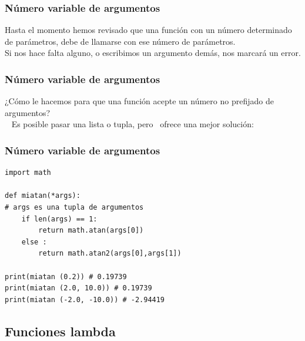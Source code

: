 \documentclass[12pt]{beamer}
\begin{document}
\begin{frame}[fragile]
\frametitle{Número variable de argumentos}
Hasta el momento hemos revisado que una función con un número determinado de parámetros, debe de llamarse con ese número de parámetros.
\\
\bigskip
\pause
Si nos hace falta alguno, o escribimos un argumento demás, nos marcará un error.
\end{frame}
\begin{frame}[fragile]
\frametitle{Número variable de argumentos}    
¿Cómo le hacemos para que una función acepte un número no prefijado de argumentos?
\\
\
\pause
Es posible pasar una lista o tupla, pero \python\ ofrece una mejor solución:
\end{frame}
\begin{frame}[fragile]
\frametitle{Número variable de argumentos}
\begin{lstlisting}[caption=Uso de *args, basicstyle=\linespread{1.2}\ttfamily\footnotesize, columns=fullflexible,escapeinside=||]
import math

def miatan(*args):
# args es una tupla de argumentos
    if len(args) == 1:
        return math.atan(args[0])
    else :
        return math.atan2(args[0],args[1])

print(miatan (0.2)) # 0.19739
print(miatan (2.0, 10.0)) # 0.19739
print(miatan (-2.0, -10.0)) # -2.94419
\end{lstlisting}
\end{frame}

\subsection{Funciones lambda}
\end{document}
